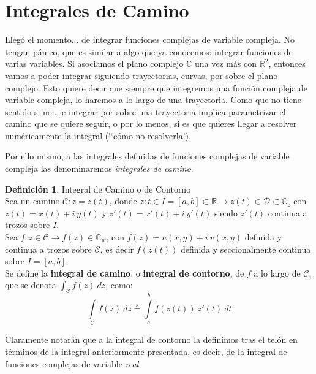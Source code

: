 \documentclass[12pt]{article}
\theoremstyle{definition}
\newtheorem{definition}{Definici\'on}[section]
\theoremstyle{theorem}
\theoremstyle{corolary}
\begin{document}
\section{Integrales de Camino}
Lleg\'o el momento... de integrar funciones complejas de variable compleja. No tengan p\'anico, que es similar a algo que ya conocemos: integrar funciones de varias variables. Si asociamos el plano complejo $\mathbb{C}$ una vez m\'as con $\mathbb{R}^2$, entonces vamos a poder integrar siguiendo trayectorias, curvas, por sobre el plano complejo. Esto quiere decir que siempre que integremos una funci\'on compleja de variable compleja, lo haremos a lo largo de una trayectoria. Como que no tiene sentido si no... e integrar por sobre una trayectoria implica parametrizar el camino que se quiere seguir, o por lo menos, si es que quieres llegar a resolver num\'ericamente la integral (!`c\'omo no resolverla!).

Por ello mismo, a las integrales definidas de funciones complejas de variable compleja las denominaremos \textit{integrales de camino}.\\

\colorbox{green!40!white!80}{\parbox{\linewidth}{
 \theoremstyle{definition}
 \begin{definition}{Integral de Camino o de Contorno}\\

  	Sea un camino $\mathcal{C}: z = z(t) $, donde $z: t\in I =[a, b]\subset \mathbb{R} \rightarrow z(t) \in \mathcal{D}\subset \mathbb{C}_z$ con $z(t) = x(t)+i\ y(t)$ y $z'(t) = x'(t)+i\ y'(t)$ siendo $z'(t)$ continua a trozos sobre $I$.\\
  	
  	Sea $f:z\in \mathcal{C} \rightarrow f(z)\in \mathbb{C}_w$, con $f(z) = u(x, y)+i\ v(x, y)$ definida y continua a trozos sobre $\mathcal{C}$, es decir $f(z(t))$ definida y seccionalmente continua sobre $I=[a,b]$.\\
  	
  	Se define la \textbf{integral de camino}, o \textbf{integral de contorno}, de $f$ a lo largo de $\mathcal{C}$, que se denota $\int_{\mathcal{C}}f(z)\ dz$, como: $$\int\limits_{\mathcal{C}}f(z)\ dz \triangleq \int\limits_a^bf(z(t))\ z'(t)\ dt$$
  	
 \end{definition}}}
\linebreak
\linebreak

Claramente notar\'an que a la integral de contorno la definimos tras el tel\'on en t\'erminos de la integral anteriormente presentada, es decir, de la integral de funciones complejas de variable \textit{real}.
\end{document}
